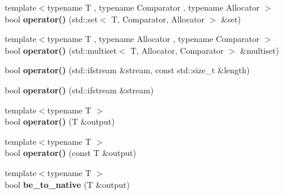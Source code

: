 \begin{DoxyCompactItemize}
\item 
\hypertarget{classstrtk_1_1binary_1_1reader_a147964977914bd343d11c4a2b18523a2}{{\footnotesize template$<$typename T , typename Comparator , typename Allocator $>$ }\\bool {\bfseries operator()} (std\-::set$<$ T, Comparator, Allocator $>$ \&set)}\label{classstrtk_1_1binary_1_1reader_a147964977914bd343d11c4a2b18523a2}

\item 
\hypertarget{classstrtk_1_1binary_1_1reader_a2df4318d301c74d710a2554a71f8309b}{{\footnotesize template$<$typename T , typename Allocator , typename Comparator $>$ }\\bool {\bfseries operator()} (std\-::multiset$<$ T, Allocator, Comparator $>$ \&multiset)}\label{classstrtk_1_1binary_1_1reader_a2df4318d301c74d710a2554a71f8309b}

\item 
\hypertarget{classstrtk_1_1binary_1_1reader_a55dd49958fecb7e9e14beea8fe34939b}{bool {\bfseries operator()} (std\-::ifstream \&stream, const std\-::size\-\_\-t \&length)}\label{classstrtk_1_1binary_1_1reader_a55dd49958fecb7e9e14beea8fe34939b}

\item 
\hypertarget{classstrtk_1_1binary_1_1reader_a0a21eab78cea0b224add5897adf58035}{bool {\bfseries operator()} (std\-::ifstream \&stream)}\label{classstrtk_1_1binary_1_1reader_a0a21eab78cea0b224add5897adf58035}

\item 
\hypertarget{classstrtk_1_1binary_1_1reader_ab5440c08282f2e8ee6922ed1ba38aa3f}{{\footnotesize template$<$typename T $>$ }\\bool {\bfseries operator()} (T \&output)}\label{classstrtk_1_1binary_1_1reader_ab5440c08282f2e8ee6922ed1ba38aa3f}

\item 
\hypertarget{classstrtk_1_1binary_1_1reader_a0c0c3d6afbe4fa52497cdcda779c4348}{{\footnotesize template$<$typename T $>$ }\\bool {\bfseries operator()} (const T \&output)}\label{classstrtk_1_1binary_1_1reader_a0c0c3d6afbe4fa52497cdcda779c4348}

\item 
\hypertarget{classstrtk_1_1binary_1_1reader_a6f293e7966fe6b4777b0a99ab96b8980}{{\footnotesize template$<$typename T $>$ }\\bool {\bfseries be\-\_\-to\-\_\-native} (T \&output)}\label{classstrtk_1_1binary_1_1reader_a6f293e7966fe6b4777b0a99ab96b8980}


\end{DoxyCompactItemize}
